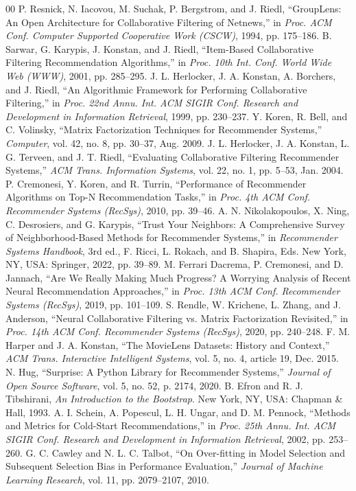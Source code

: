 \documentclass[conference]{IEEEtran}
\begin{document}
\begin{thebibliography}{00}
 P. Resnick, N. Iacovou, M. Suchak, P. Bergstrom, and J. Riedl, ``GroupLens: An Open Architecture for Collaborative Filtering of Netnews,'' in \textit{Proc. ACM Conf. Computer Supported Cooperative Work (CSCW)}, 1994, pp. 175--186.
 B. Sarwar, G. Karypis, J. Konstan, and J. Riedl, ``Item-Based Collaborative Filtering Recommendation Algorithms,'' in \textit{Proc. 10th Int. Conf. World Wide Web (WWW)}, 2001, pp. 285--295.
 J. L. Herlocker, J. A. Konstan, A. Borchers, and J. Riedl, ``An Algorithmic Framework for Performing Collaborative Filtering,'' in \textit{Proc. 22nd Annu. Int. ACM SIGIR Conf. Research and Development in Information Retrieval}, 1999, pp. 230--237.
 Y. Koren, R. Bell, and C. Volinsky, ``Matrix Factorization Techniques for Recommender Systems,'' \textit{Computer}, vol. 42, no. 8, pp. 30--37, Aug. 2009.
 J. L. Herlocker, J. A. Konstan, L. G. Terveen, and J. T. Riedl, ``Evaluating Collaborative Filtering Recommender Systems,'' \textit{ACM Trans. Information Systems}, vol. 22, no. 1, pp. 5--53, Jan. 2004.
 P. Cremonesi, Y. Koren, and R. Turrin, ``Performance of Recommender Algorithms on Top-N Recommendation Tasks,'' in \textit{Proc. 4th ACM Conf. Recommender Systems (RecSys)}, 2010, pp. 39--46.
 A. N. Nikolakopoulos, X. Ning, C. Desrosiers, and G. Karypis, ``Trust Your Neighbors: A Comprehensive Survey of Neighborhood-Based Methods for Recommender Systems,'' in \textit{Recommender Systems Handbook}, 3rd ed., F. Ricci, L. Rokach, and B. Shapira, Eds. New York, NY, USA: Springer, 2022, pp. 39--89.
 M. Ferrari Dacrema, P. Cremonesi, and D. Jannach, ``Are We Really Making Much Progress? A Worrying Analysis of Recent Neural Recommendation Approaches,'' in \textit{Proc. 13th ACM Conf. Recommender Systems (RecSys)}, 2019, pp. 101--109.
 S. Rendle, W. Krichene, L. Zhang, and J. Anderson, ``Neural Collaborative Filtering vs. Matrix Factorization Revisited,'' in \textit{Proc. 14th ACM Conf. Recommender Systems (RecSys)}, 2020, pp. 240--248.
 F. M. Harper and J. A. Konstan, ``The MovieLens Datasets: History and Context,'' \textit{ACM Trans. Interactive Intelligent Systems}, vol. 5, no. 4, article 19, Dec. 2015.
 N. Hug, ``Surprise: A Python Library for Recommender Systems,'' \textit{Journal of Open Source Software}, vol. 5, no. 52, p. 2174, 2020.
 B. Efron and R. J. Tibshirani, \textit{An Introduction to the Bootstrap}. New York, NY, USA: Chapman \& Hall, 1993.
 A. I. Schein, A. Popescul, L. H. Ungar, and D. M. Pennock, ``Methods and Metrics for Cold-Start Recommendations,'' in \textit{Proc. 25th Annu. Int. ACM SIGIR Conf. Research and Development in Information Retrieval}, 2002, pp. 253--260.
 G. C. Cawley and N. L. C. Talbot, ``On Over-fitting in Model Selection and Subsequent Selection Bias in Performance Evaluation,'' \textit{Journal of Machine Learning Research}, vol. 11, pp. 2079--2107, 2010.
\end{thebibliography}
\end{document}

